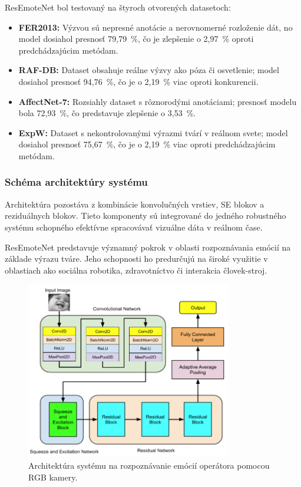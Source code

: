 ResEmoteNet bol testovaný na štyroch otvorených datasetoch:
\begin{itemize}
    \item \textbf{FER2013:} Výzvou sú nepresné anotácie a nerovnomerné rozloženie dát, no model dosiahol presnosť 79,79~\%, čo je zlepšenie o 2,97~\% oproti predchádzajúcim metódam.
    \item \textbf{RAF-DB:} Dataset obsahuje reálne výzvy ako póza či osvetlenie; model dosiahol presnosť 94,76~\%, čo je o 2,19~\% viac oproti konkurencii.
    \item \textbf{AffectNet-7:} Rozsiahly dataset s rôznorodými anotáciami; presnosť modelu bola 72,93~\%, čo predstavuje zlepšenie o 3,53~\%.
    \item \textbf{ExpW:} Dataset s nekontrolovanými výrazmi tvárí v reálnom svete; model dosiahol presnosť 75,67~\%, čo je o 2,19~\% viac oproti predchádzajúcim metódam.
\end{itemize}

\subsubsection{Schéma architektúry systému}

Architektúra pozostáva z kombinácie konvolučných vrstiev, SE blokov a reziduálnych blokov. Tieto komponenty sú integrované do jedného robustného systému schopného efektívne spracovávať vizuálne dáta v reálnom čase.

ResEmoteNet predstavuje významný pokrok v oblasti rozpoznávania emócií na základe výrazu tváre. Jeho schopnosti ho predurčujú na široké využitie v oblastiach ako sociálna robotika, zdravotníctvo či interakcia človek-stroj.

\begin{figure}[!htpb]
    \centering
    \includegraphics[width=0.8\textwidth]{img/architecture.png}
    \caption{Architektúra systému na rozpoznávanie emócií operátora pomocou RGB kamery.} 
    \label{fig:architecture}
\end{figure}
\newpage

